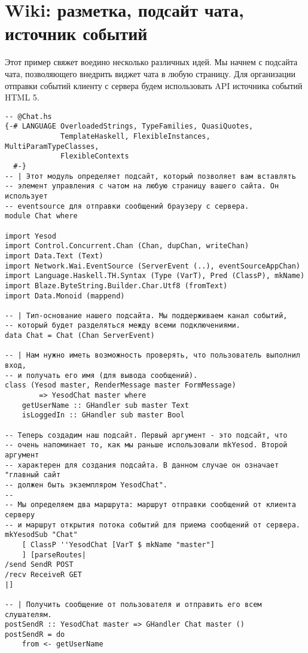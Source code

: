 
\chapter{Wiki: разметка, подсайт чата, источник событий}
\label{}

Этот пример свяжет воедино несколько различных идей. Мы начнем с подсайта чата, позволяющего внедрить виджет чата в любую страницу. Для организации отправки событий клиенту с сервера будем использовать API источника событий HTML 5.

\begin{lstlisting}
-- @Chat.hs
{-# LANGUAGE OverloadedStrings, TypeFamilies, QuasiQuotes,
             TemplateHaskell, FlexibleInstances, MultiParamTypeClasses,
             FlexibleContexts
  #-}
-- | Этот модуль определяет подсайт, который позволяет вам вставлять
-- элемент управления с чатом на любую страницу вашего сайта. Он использует
-- eventsource для отправки сообщений браузеру с сервера.
module Chat where

import Yesod
import Control.Concurrent.Chan (Chan, dupChan, writeChan)
import Data.Text (Text)
import Network.Wai.EventSource (ServerEvent (..), eventSourceAppChan)
import Language.Haskell.TH.Syntax (Type (VarT), Pred (ClassP), mkName)
import Blaze.ByteString.Builder.Char.Utf8 (fromText)
import Data.Monoid (mappend)

-- | Тип-основание нашего подсайта. Мы поддерживаем канал событий,
-- который будет разделяться между всеми подключениями.
data Chat = Chat (Chan ServerEvent)

-- | Нам нужно иметь возможность проверять, что пользователь выполнил вход,
-- и получать его имя (для вывода сообщений).
class (Yesod master, RenderMessage master FormMessage)
        => YesodChat master where
    getUserName :: GHandler sub master Text
    isLoggedIn :: GHandler sub master Bool

-- Теперь создадим наш подсайт. Первый аргумент - это подсайт, что
-- очень напоминает то, как мы раньше использовали mkYesod. Второй аргумент
-- характерен для создания подсайта. В данном случае он означает "главный сайт
-- должен быть экземпляром YesodChat".
--
-- Мы определяем два маршрута: маршрут отправки сообщений от клиента серверу
-- и маршрут открытия потока событий для приема сообщений от сервера.
mkYesodSub "Chat"
    [ ClassP ''YesodChat [VarT $ mkName "master"]
    ] [parseRoutes|
/send SendR POST
/recv ReceiveR GET
|]

-- | Получить сообщение от пользователя и отправить его всем слушателям.
postSendR :: YesodChat master => GHandler Chat master ()
postSendR = do
    from <- getUserName


\end{lstlisting}
